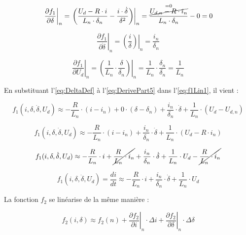 \begin{equation}
    \left. \frac{\partial f_1}{\partial \delta} \right|_{n} = \left. \left( \frac{U_d - R\cdot i}{L_n \cdot \delta_n} - \frac{i \cdot \dot{\delta}}{\delta^2} \right) \right|_{n} = \frac{\overset{=0}{\cancel{U_{d,n} - R\cdot i_n}}}{L_n \cdot \delta_n} - 0 = 0
    \label{eq:DerivePart3}
\end{equation}

\begin{equation}
    \left. \frac{\partial f_1}{\partial \dot{\delta}} \right|_{n} = \left. \left( \frac{i}{\delta} \right) \right|_{n} = \frac{i_n}{\delta_n}
    \label{eq:DerivePart4}
\end{equation}

\begin{equation}
    \left. \frac{\partial f_1}{\partial U_d} \right|_{n} =
    \left. \left( \frac{1}{L_n}\cdot\frac{\delta}{\delta_n} \right) \right|_{n} = \frac{1}{L_n}\cdot\frac{\delta_n}{\delta_n} = \frac{1}{L_n}
    \label{eq:DerivePart5}
\end{equation}

En substituant l'\autoref{eq:DeltaDef} à l'\autoref{eq:DerivePart5} dans l'\autoref{eq:f1Lin1}, il vient :

$$f_1(i, \delta, \dot{\delta}, U_d) \approx
    -\frac{R}{L_n} \cdot (i-i_n)
    + 0 \cdot (\delta-\delta_n)
    + \frac{i_n}{\delta_n}\cdot\dot{\delta}
    + \frac{1}{L_n}\cdot (U_d-U_{d,n}) $$

$$f_1(i, \delta, \dot{\delta}, U_d) \approx
    -\frac{R}{L_n} \cdot (i-i_n)
    + \frac{i_n}{\delta_n}\cdot\dot{\delta}
    + \frac{1}{L_n}\cdot (U_d-R\cdot i_n)$$

$$f_1(i, \delta, \dot{\delta}, U_d) \approx
    -\frac{R}{L_n} \cdot i
    + \cancel{\frac{R}{L_n} \cdot i_n}
    + \frac{i_n}{\delta_n}\cdot\dot{\delta}
    + \frac{1}{L_n}\cdot U_d
    - \cancel{\frac{R}{L_n}\cdot i_n} $$

\begin{equation}
    f_1(i, \delta, \dot{\delta}, U_d) = \frac{di}{dt} \approx
    -\frac{R}{L_n} \cdot i
    + \frac{i_n}{\delta_n}\cdot\dot{\delta}
    + \frac{1}{L_n}\cdot U_d
    \label{eq:f1Lin2}
\end{equation}

La fonction $f_2$ se linéarise de la même manière :

\begin{equation}
    f_2(i, \delta) \approx f_2(n)
    + \left. \frac{\partial f_2}{\partial i} \right|_{n}\cdot\Delta{i}
    + \left. \frac{\partial f_2}{\partial \delta} \right|_{n}\cdot\Delta{\delta}
    \label{eq:f2Lin1}
\end{equation}

